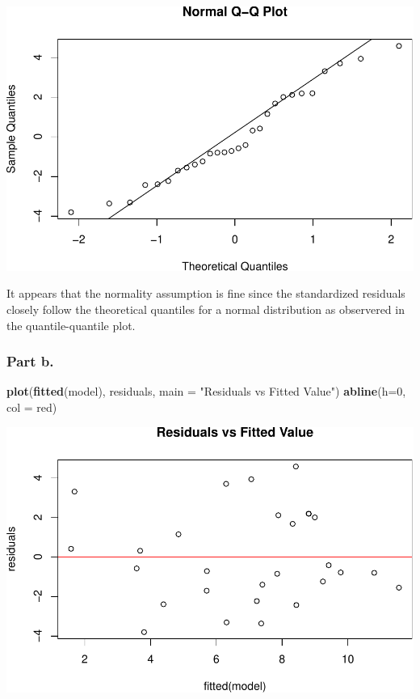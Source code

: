 \documentclass[
  11pt,
]{article}
\newenvironment{Shaded}{\begin{snugshade}}{\end{snugshade}}
\newcommand{\AttributeTok}[1]{\textcolor[rgb]{0.13,0.29,0.53}{#1}}
\newcommand{\DecValTok}[1]{\textcolor[rgb]{0.00,0.00,0.81}{#1}}
\newcommand{\FunctionTok}[1]{\textcolor[rgb]{0.13,0.29,0.53}{\textbf{#1}}}
\newcommand{\NormalTok}[1]{#1}
\newcommand{\StringTok}[1]{\textcolor[rgb]{0.31,0.60,0.02}{#1}}
\begin{document}
\includegraphics[width=0.9\linewidth]{examples_files/figure-latex/unnamed-chunk-20-1}

It appears that the normality assumption is fine since the standardized
residuals closely follow the theoretical quantiles for a normal
distribution as observered in the quantile-quantile plot.

\subsubsection{Part b.}\label{part-b.-4}

\begin{Shaded}
\begin{Highlighting}[]
\FunctionTok{plot}\NormalTok{(}\FunctionTok{fitted}\NormalTok{(model), residuals, }\AttributeTok{main =} \StringTok{"Residuals vs Fitted Value"}\NormalTok{)}
\FunctionTok{abline}\NormalTok{(}\AttributeTok{h=}\DecValTok{0}\NormalTok{, }\AttributeTok{col =} \StringTok{\textquotesingle{}red\textquotesingle{}}\NormalTok{)}
\end{Highlighting}
\end{Shaded}

\includegraphics[width=0.75\linewidth]{examples_files/figure-latex/unnamed-chunk-21-1}
\end{document}
